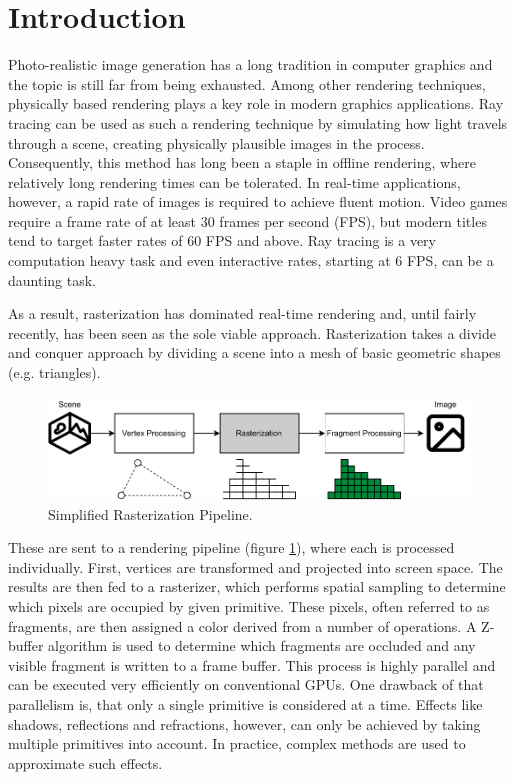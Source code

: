 \section{Introduction}
Photo-realistic image generation has a long tradition in computer graphics and the topic is still far from being exhausted. Among other rendering techniques, physically based rendering plays a key role in modern graphics applications. Ray tracing can be used as such a rendering technique by simulating how light travels through a scene, creating physically plausible images in the process. Consequently, this method has long been a staple in offline rendering, where relatively long rendering times can be tolerated. In real-time applications, however, a rapid rate of images is required to achieve fluent motion. Video games require a frame rate of at least 30 frames per second (FPS), but modern titles tend to target faster rates of 60 FPS and above. Ray tracing is a very computation heavy task and even interactive rates, starting at 6 FPS, can be a daunting task. 

As a result, rasterization has dominated real-time rendering and, until fairly recently, has been seen as the sole viable approach. Rasterization takes a divide and conquer approach by dividing a scene into a mesh of basic geometric shapes (e.g. triangles). 
\begin{figure}
    \centering
    \includegraphics[width=400pt]{images/rasterization_pipeline.pdf}
    \caption{Simplified Rasterization Pipeline.}
    \label{fig:raster_pipeline}
\end{figure}
These are sent to a rendering pipeline (figure \ref{fig:raster_pipeline}), where each is processed individually. First, vertices are transformed and projected into screen space. The results are then fed to a rasterizer, which performs spatial sampling to determine which pixels are occupied by given primitive. These pixels, often referred to as fragments, are then assigned a color derived from a number of operations. A Z-buffer algorithm is used to determine which fragments are occluded and any visible fragment is written to a frame buffer. This process is highly parallel and can be executed very efficiently on conventional GPUs. One drawback of that parallelism is, that only a single primitive is considered at a time. Effects like shadows, reflections and refractions, however, can only be achieved by taking multiple primitives into account. In practice, complex methods are used to approximate such effects.

